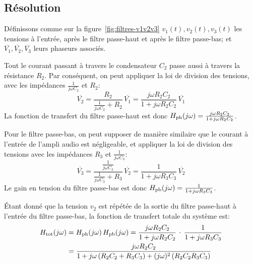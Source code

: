 \subsection{Résolution}

Définissons comme sur la figure~\ref{fig:filtres-v1v2v3}
$v_1(t),v_2(t),v_3(t)$ les tensions
à l'entrée, après le filtre passe-haut et après le filtre passe-bas;
et $\overline{V_1}, \overline{V_2}, \overline{V_3}$ leurs phaseurs associés.

Tout le courant passant à travers le condensateur $C_2$ passe
aussi à travers la résistance $R_2$.
Par conséquent, on peut appliquer la loi de division des tensions,
avec les impédances $\frac{1}{j\omega C_2}$ et $R_2$:
\begin{equation}
    \overline{V_2} = \frac{R_2}{\frac{1}{j\omega C_2} + R_2}\,\overline{V_1}
    = \frac{j\omega R_2C_2}{1+j\omega R_2C_2}\,\overline{V_1}
\end{equation}
La fonction de transfert du filtre passe-haut est donc
$H_{\mathrm{ph}}(j\omega) = \frac{j\omega R_2C_2}{1+j\omega R_2C_2}$.

Pour le filtre passe-bas, on peut supposer de manière similaire que
le courant à l'entrée de l'ampli audio est négligeable,
et appliquer la loi de division des tensions avec les impédances
$R_3$ et $\frac{1}{j\omega C_3}$:
\begin{equation}
    \overline{V_3} =
    \frac{\frac{1}{j\omega C_3}}{\frac{1}{j\omega C_3} + R_3}\,\overline{V_2}
    = \frac{1}{1+j\omega R_3C_3}\,\overline{V_2}
\end{equation}
Le gain en tension du filtre passe-bas est donc
$H_{\mathrm{pb}}(j\omega) = \frac{1}{1 + j\omega R_3C_3}$.

Étant donné que la tension $v_2$ est répétée de la sortie du filtre passe-haut
à l'entrée du filtre passe-bas, la fonction de transfert totale du système est:
\begin{align}
    H_{\mathrm{tot}}(j\omega) &= H_{\mathrm{ph}}(j\omega)\,H_{\mathrm{pb}}(j\omega) =
    \frac{j\omega R_2C_2}{1 + j\omega R_2C_2}\,\cdot\,
    \frac{1}{1 + j\omega R_3C_3}\\
    &= \frac{j\omega R_2C_2}{1 + j\omega\,(R_2C_2+R_3C_3) +
        (j\omega)^2\,(R_2C_2R_3C_3)}
\end{align}

